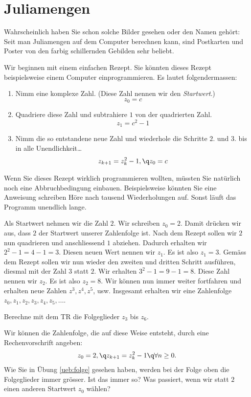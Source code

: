 \documentclass[%
11pt,%
twoside,%
titlepage,%
german,%
headsepline%
]{scrartcl}
\begin{document}
\section{Juliamengen}

Wahrscheinlich haben Sie schon solche Bilder gesehen oder den Namen geh\"ort: Seit man Juliamengen auf dem Computer berechnen kann, sind Postkarten und Poster von den farbig schillernden Gebilden sehr beliebt.

Wir beginnen mit einem einfachen Rezept. Sie k\"onnten dieses Rezept beispielsweise einem Computer einprogrammieren. Es lautet folgendermassen:
\begin{enumerate}
\item Nimm eine komplexe Zahl. (Diese Zahl nennen wir den \emph{Startwert}.)
$$z_0=c$$
\item Quadriere diese Zahl und subtrahiere $1$ von der quadrierten Zahl.
$$z_1=c^2-1$$
\item Nimm die so entstandene neue Zahl und wiederhole die Schritte $2.$ und $3.$ bis in alle Unendlichkeit\dots
$$z_{k+1}=z_k^2-1,\q z_0=c$$
\end{enumerate}
\begin{bem}
Wenn Sie dieses Rezept wirklich programmieren wollten, m\"ussten Sie nat\"urlich noch eine Abbruchbedingung einbauen. Beispielsweise k\"onnten Sie eine Anweisung schreiben \glqq H\"ore nach tausend Wiederholungen auf\grqq. Sonst läuft das Programm unendlich lange.
\end{bem}

\begin{bsp}
Als Startwert nehmen wir die Zahl $2$. Wir schreiben $z_0 = 2$. Damit dr\"ucken wir aus, dass $2$ der Startwert unserer Zahlenfolge ist.
Nach dem Rezept sollen wir $2$ nun quadrieren und anschliessend $1$ abziehen. Dadurch erhalten wir $2^2 - 1 = 4 - 1 = 3$. Diesen neuen Wert nennen wir $z_1$. Es ist also $z_1 = 3$.
Gemäss dem Rezept sollen wir nun wieder den zweiten und dritten Schritt ausf\"uhren, diesmal mit der Zahl $3$ statt $2$. Wir erhalten $3^2 -1 = 9-1 = 8$. Diese Zahl nennen wir $z_2$. Es ist also $z_2 = 8$.
Wir k\"onnen nun immer weiter fortfahren und erhalten neue Zahlen $z^3, z^4, z^5$, usw. Insgesamt erhalten wir eine Zahlenfolge $z_0, z_1, z_2, z_3, z_4, z_5,\dots$.
\end{bsp}
\begin{ueb}[Folge] \label{ueb:folge}
Berechne mit dem TR die Folgeglieder $z_3$ bis $z_6$.
\end{ueb}
Wir k\"onnen die Zahlenfolge, die auf diese Weise entsteht, durch eine Rechenvorschrift angeben:
$$z_0=2,\q z_{k+1}=z_k^2-1\q\forall n\geq0.$$
Wie Sie in \"Ubung \ref{ueb:folge} gesehen haben, werden bei der Folge oben die Folgeglieder immer gr\"osser. Ist das immer so? Was passiert, wenn wir statt $2$ einen anderen Startwert $z_0$ wählen?
\end{document}
